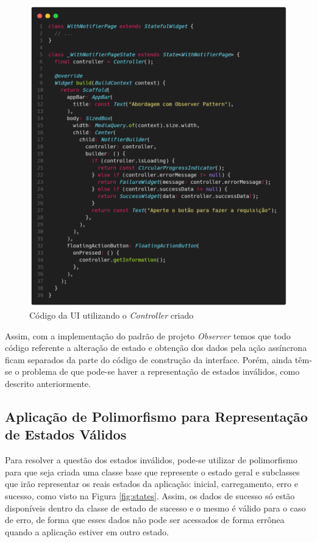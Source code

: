 \documentclass[12pt, %
openright, 
oneside, %
a4paper,    %
brazil]{facom-ufu-abntex2}
\begin{document}
\begin{figure}[ht]
    \centering
    \includegraphics[width=.65\textwidth, trim={0 30 0 100}, clip]{figures/states/with_notifier_page.png}
    \caption{Código da UI utilizando o \textit{Controller} criado}
    \label{fig:with_notifier_page}
\end{figure}

Assim, com a implementação do padrão de projeto \textit{Observer} temos que todo código referente a alteração de estado e obtenção dos dados pela ação assíncrona ficam separados da parte do código de construção da interface. Porém, ainda têm-se o problema de que pode-se haver a representação de estados inválidos, como descrito anteriormente.

\subsection{Aplicação de Polimorfismo para Representação de Estados Válidos}

Para resolver a questão dos estados inválidos, pode-se utilizar de polimorfismo para que seja criada uma classe base que represente o estado geral e subclasses que irão representar os reais estados da aplicação: inicial, carregamento, erro e sucesso, como visto na Figura \ref{fig:states}. Assim, os dados de sucesso só estão disponíveis dentro da classe de estado de sucesso e o mesmo é válido para o caso de erro, de forma que esses dados não pode ser acessados de forma errônea quando a aplicação estiver em outro estado.
\end{document}
